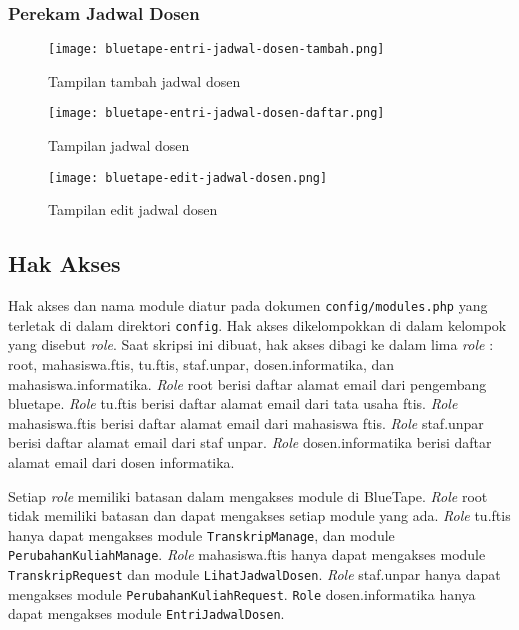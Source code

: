 	\subsubsection{Perekam Jadwal Dosen}
	\begin{figure}[H]
		\centering  
		\texttt{[image: bluetape-entri-jadwal-dosen-tambah.png]}  
		\caption[Tampilan tambah jadwal dosen]{Tampilan tambah jadwal dosen} 
		\label{fig:bluetape-entri-jadwal-dosen-tambah} 
	\end{figure}
	
	\begin{figure}[H]
		\centering  
		\texttt{[image: bluetape-entri-jadwal-dosen-daftar.png]}  
		\caption[Tampilan jadwal dosen]{Tampilan jadwal dosen} 
		\label{fig:bluetape-entri-jadwal-dosen-daftar} 
	\end{figure}
	
	\begin{figure}[H]
		\centering  
		\texttt{[image: bluetape-edit-jadwal-dosen.png]}  
		\caption[Tampilan edit jadwal dosen]{Tampilan edit jadwal dosen} 
		\label{fig:bluetape-edit-jadwal-dosen} 
	\end{figure}

\subsection{Hak Akses}
	Hak akses dan nama module diatur pada dokumen \texttt{config/modules.php} yang terletak di dalam direktori \texttt{config}. Hak akses dikelompokkan di dalam kelompok yang disebut \textit{role}. Saat skripsi ini dibuat, hak akses dibagi ke dalam lima \textit{role} : root, mahasiswa.ftis, tu.ftis, staf.unpar, dosen.informatika, dan mahasiswa.informatika. \textit{Role} root berisi daftar alamat email dari pengembang bluetape. \textit{Role} tu.ftis berisi daftar alamat email dari tata usaha ftis. \textit{Role} mahasiswa.ftis berisi daftar alamat email dari mahasiswa ftis. \textit{Role} staf.unpar berisi daftar alamat email dari staf unpar. \textit{Role} dosen.informatika berisi daftar alamat email dari dosen informatika.

	Setiap \textit{role} memiliki batasan dalam mengakses module di BlueTape. \textit{Role} root tidak memiliki batasan dan dapat mengakses setiap module yang ada. \textit{Role} tu.ftis hanya dapat mengakses module \texttt{TranskripManage}, dan module \texttt{PerubahanKuliahManage}. \textit{Role} mahasiswa.ftis hanya dapat mengakses module \texttt{TranskripRequest} dan module \texttt{LihatJadwalDosen}. \textit{Role} staf.unpar hanya dapat mengakses module \texttt{PerubahanKuliahRequest}. \texttt{Role} dosen.informatika hanya dapat mengakses module \texttt{EntriJadwalDosen}.

